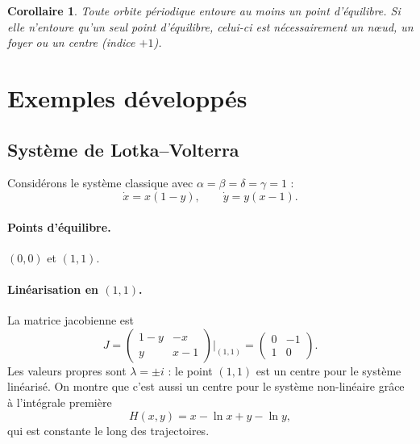 \documentclass[12pt,a4paper,openany]{book}
\theoremstyle{definition}
\theoremstyle{plain}
\newtheorem{corollaire}[definition]{Corollaire}
\theoremstyle{remark}
\begin{document}
\begin{corollaire}
\label{cor:indice-cycle}
Toute orbite périodique entoure au moins un point d'équilibre.
Si elle n'entoure qu'un seul point d'équilibre, celui-ci est
nécessairement un n\oe ud, un foyer ou un centre (indice $+1$).
\end{corollaire}

\section{Exemples développés}
\label{sec:exemples-nonlin}

\subsection{Système de Lotka--Volterra}
\label{subsec:lotka-volterra-detail}

Considérons le système classique avec $\alpha = \beta = \delta = \gamma = 1$ :
\begin{equation}
\label{eq:LV-classique}
\dot{x} = x(1 - y), \qquad \dot{y} = y(x - 1).
\end{equation}

\paragraph{Points d'équilibre.}
$(0,0)$ et $(1,1)$.

\paragraph{Linéarisation en $(1,1)$.}
La matrice jacobienne est
\[
J = \begin{pmatrix}
1 - y & -x \\ y & x - 1
\end{pmatrix}\bigg|_{(1,1)}
= \begin{pmatrix} 0 & -1 \\ 1 & 0 \end{pmatrix}.
\]
Les valeurs propres sont $\lambda = \pm i$ : le point $(1,1)$ est un
centre pour le système linéarisé. On montre que c'est aussi un centre
pour le système non-linéaire grâce à l'intégrale première
\begin{equation}
\label{eq:LV-integrale}
H(x,y) = x - \ln x + y - \ln y,
\end{equation}
qui est constante le long des trajectoires.
\end{document}
